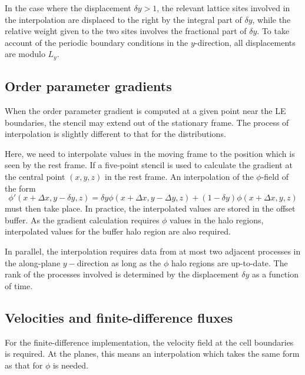 In the case where the displacement $\delta y > 1$, the relevant
lattice sites involved in the interpolation are displaced to the right
by the integral part of $\delta y$, while the relative weight given to
the two sites involves
the fractional part of $\delta y$. To take account of the periodic
boundary conditions
in the $y$-direction, all displacements are modulo $L_y$.


\subsection{Order parameter gradients}

When the order parameter gradient is computed at a given point
near the LE boundaries, the stencil may extend out of the stationary
frame. The process of interpolation is slightly different to that
for the distributions.

Here, we need to interpolate values in the moving frame to the position
which is seen by the rest frame. If a five-point
stencil is used to calculate the gradient at the central point
$(x,y,z)$ in the
rest frame. An interpolation of the $\phi$-field of the form
\begin{equation}
\phi'(x + \Delta x, y - \delta y, z) =
\delta y \phi(x + \Delta x,  y - \Delta y, z) + 
(1 - \delta y) \phi(x + \Delta x, y, z)
\end{equation}
must then take place. In practice, the interpolated values are stored
in the offset buffer. As the gradient calculation requires $\phi$
values in the halo regions, interpolated values for the buffer halo
region are also required.

In parallel, the interpolation requires data from at most two adjacent
processes in the along-plane $y-$direction as long as the $\phi$ halo
regions are up-to-date. The rank of the processes involved is
determined by the displacement $\delta y$ as a function of time.


\subsection{Velocities and finite-difference fluxes}

For the finite-difference implementation, the velocity field at
the cell boundaries is required. At the planes, this means an
interpolation which takes the same form as that for
$\phi$ is needed.

